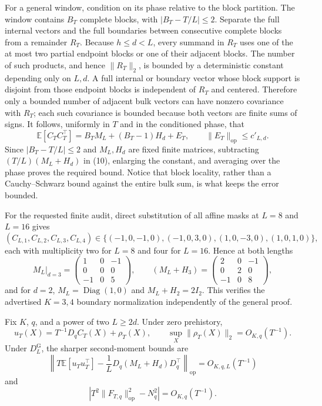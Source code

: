 For a general window, condition on its phase relative to the block partition.  The window contains \(B_T\) complete blocks, with \(|B_T-T/L|\le2\).  Separate the full internal vectors and the full boundaries between consecutive complete blocks from a remainder \(R_T\).  Because \(h\le d<L\), every summand in \(R_T\) uses one of the at most two partial endpoint blocks or one of their adjacent blocks.  The number of such products, and hence \(\|R_T\|_2\), is bounded by a deterministic constant depending only on \(L,d\).  A full internal or boundary vector whose block support is disjoint from those endpoint blocks is independent of \(R_T\) and centered.  Therefore only a bounded number of adjacent bulk vectors can have nonzero covariance with \(R_T\); each such covariance is bounded because both vectors are finite sums of signs.  It follows, uniformly in \(T\) and in the conditioned phase, that
\[
\mathbb E[C_TC_T^{\top}]
=B_TM_L+(B_T-1)H_d+E_T,
\qquad \|E_T\|_{\mathrm{op}}\le c'_{L,d}. \tag{10}
\]
Since \(|B_T-T/L|\le2\) and \(M_L,H_d\) are fixed finite matrices, subtracting \((T/L)(M_L+H_d)\) in (10), enlarging the constant, and averaging over the phase proves the required bound.  Notice that block locality, rather than a Cauchy--Schwarz bound against the entire bulk sum, is what keeps the error bounded.

For the requested finite audit, direct substitution of all affine masks at \(L=8\) and \(L=16\) gives
\[
(C_{L,1},C_{L,2},C_{L,3},C_{L,4})
\in\{(-1,0,-1,0),(-1,0,3,0),(1,0,-3,0),(1,0,1,0)\}, \tag{11}
\]
each with multiplicity two for \(L=8\) and four for \(L=16\).  Hence at both lengths
\[
M_L\big|_{d=3}=\begin{pmatrix}1&0&-1\\0&0&0\\-1&0&5\end{pmatrix},
\qquad
(M_L+H_3)=\begin{pmatrix}2&0&-1\\0&2&0\\-1&0&8\end{pmatrix}, \tag{12}
\]
and for \(d=2\), \(M_L=\operatorname{Diag}(1,0)\) and \(M_L+H_2=2I_2\).  This verifies the advertised \(K=3,4\) boundary normalization independently of the general proof.

Fix \(K\), \(q\), and a power of two \(L\ge2d\).  Under zero prehistory,
\[
u_T(X)=T^{-1}D_qC_T(X)+\rho_T(X),
\qquad \sup_X\|\rho_T(X)\|_2=O_{K,q}(T^{-1}).
\]
Under \(D_L^{\mathrm G}\), the sharper second-moment bounds are
\[
\left\|T\mathbb E[u_Tu_T^{\top}]
-\frac1L D_q(M_L+H_d)D_q^{\top}\right\|_{\mathrm{op}}
=O_{K,q,L}(T^{-1})
\]
and
\[
\left|T^2\|F_{T,q}\|_{\mathrm{op}}^2-N_q^2\right|
=O_{K,q}(T^{-1}).
\]

